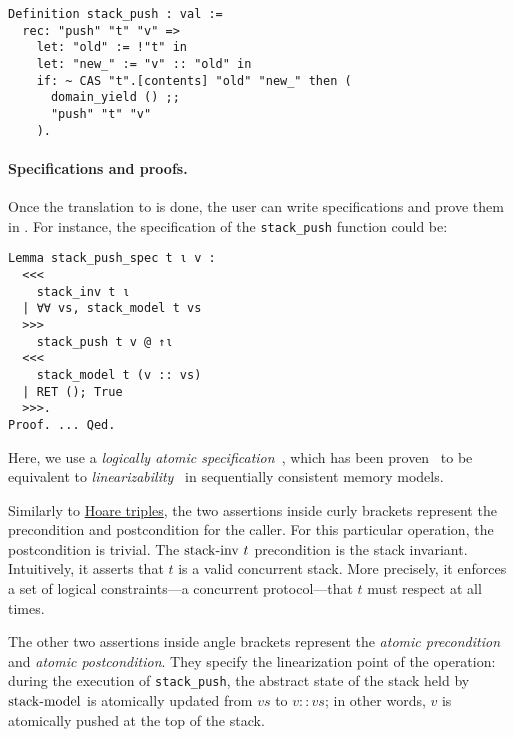 \begin{verbatim}
Definition stack_push : val :=
  rec: "push" "t" "v" =>
    let: "old" := !"t" in
    let: "new_" := "v" :: "old" in
    if: ~ CAS "t".[contents] "old" "new_" then (
      domain_yield () ;;
      "push" "t" "v"
    ).
\end{verbatim}

\paragraph{Specifications and proofs.}

Once the translation to \ZooLang is done, the user can write specifications and prove them in \Iris.
For instance, the specification of the \texttt{stack_push} function could be:

\begin{verbatim}
Lemma stack_push_spec t ι v :
  <<<
    stack_inv t ι
  | ∀∀ vs, stack_model t vs
  >>>
    stack_push t v @ ↑ι
  <<<
    stack_model t (v :: vs)
  | RET (); True
  >>>.
Proof. ... Qed.
\end{verbatim}

Here, we use a \emph{logically atomic specification}~\cite{DBLP:conf/ecoop/PintoDG14}, which has been proven~\cite{DBLP:journals/pacmpl/BirkedalDGJST21} to be equivalent to \emph{linearizability}~\cite{DBLP:journals/toplas/HerlihyW90} in sequentially consistent memory models.

Similarly to \href{https://en.wikipedia.org/wiki/Hoare_logic}{Hoare triples}, the two assertions inside curly brackets represent the precondition and postcondition for the caller.
For this particular operation, the postcondition is trivial.
The $\mathrm{stack {\hbox{-}} inv}\ t$ precondition is the stack invariant.
Intuitively, it asserts that $t$ is a valid concurrent stack.
More precisely, it enforces a set of logical constraints---a concurrent protocol---that $t$ must respect at all times.

The other two assertions inside angle brackets represent the \emph{atomic precondition} and \emph{atomic postcondition}.
They specify the linearization point of the operation: during the execution of \texttt{stack\_push}, the abstract state of the stack held by $\mathrm{stack {\hbox{-}} model}$ is atomically updated from $\mathit{vs}$ to $v :: \mathit{vs}$; in other words, $v$ is atomically pushed at the top of the stack.
